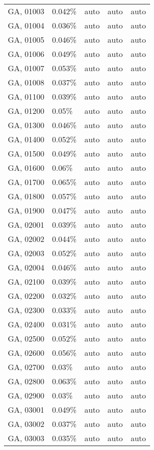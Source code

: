 \begin{longtable}[]{@{}lllll@{}}
GA, 01003 & 0.042\% & auto & auto & auto \\
GA, 01004 & 0.036\% & auto & auto & auto \\
GA, 01005 & 0.046\% & auto & auto & auto \\
GA, 01006 & 0.049\% & auto & auto & auto \\
GA, 01007 & 0.053\% & auto & auto & auto \\
GA, 01008 & 0.037\% & auto & auto & auto \\
GA, 01100 & 0.039\% & auto & auto & auto \\
GA, 01200 & 0.05\% & auto & auto & auto \\
GA, 01300 & 0.046\% & auto & auto & auto \\
GA, 01400 & 0.052\% & auto & auto & auto \\
GA, 01500 & 0.049\% & auto & auto & auto \\
GA, 01600 & 0.06\% & auto & auto & auto \\
GA, 01700 & 0.065\% & auto & auto & auto \\
GA, 01800 & 0.057\% & auto & auto & auto \\
GA, 01900 & 0.047\% & auto & auto & auto \\
GA, 02001 & 0.039\% & auto & auto & auto \\
GA, 02002 & 0.044\% & auto & auto & auto \\
GA, 02003 & 0.052\% & auto & auto & auto \\
GA, 02004 & 0.046\% & auto & auto & auto \\
GA, 02100 & 0.039\% & auto & auto & auto \\
GA, 02200 & 0.032\% & auto & auto & auto \\
GA, 02300 & 0.033\% & auto & auto & auto \\
GA, 02400 & 0.031\% & auto & auto & auto \\
GA, 02500 & 0.052\% & auto & auto & auto \\
GA, 02600 & 0.056\% & auto & auto & auto \\
GA, 02700 & 0.03\% & auto & auto & auto \\
GA, 02800 & 0.063\% & auto & auto & auto \\
GA, 02900 & 0.03\% & auto & auto & auto \\
GA, 03001 & 0.049\% & auto & auto & auto \\
GA, 03002 & 0.037\% & auto & auto & auto \\
GA, 03003 & 0.035\% & auto & auto & auto \\

\end{longtable}
